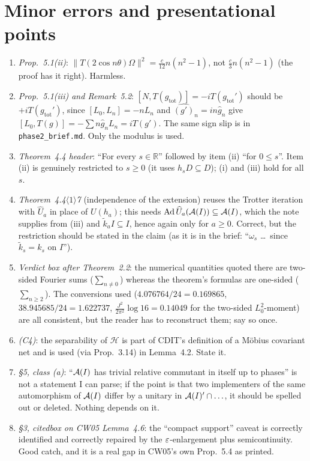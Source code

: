\documentclass[11pt]{article}
\newcommand{\Om}{\Omega}
\newcommand{\Hil}{\mathcal H}
\newcommand{\nrm}[1]{\lVert #1\rVert}
\newcommand{\gtot}{g_{\mathrm{tot}}}
\newcommand{\ktil}{\widetilde k}
\newcommand{\Ad}{\operatorname{Ad}}
\begin{document}
\section{Minor errors and presentational points}\label{sec:minor}

\begin{enumerate}[leftmargin=1.6em,label=\textup{(M\arabic*)}]
\item \emph{Prop.~5.1(ii)}: $\nrm{T(2\cos n\theta)\Om}^2=\frac c{12}n(n^2-1)$, not $\frac c3n(n^2-1)$
(the proof has it right).  Harmless.
\item \emph{Prop.~5.1(iii) and Remark~5.2}: $[N,T(\gtot)]=-iT(\gtot')$ should be $+iT(\gtot')$, since
$[L_0,L_n]=-nL_n$ and $\widehat{(g')}_n=in\hat g_n$ give $[L_0,T(g)]=-\sum n\hat g_nL_n=iT(g')$.  The same sign
slip is in \texttt{phase2\_brief.md}.  Only the modulus is used.
\item \emph{Theorem~4.4 header}: ``For every $s\in\mathbb R$'' followed by item (ii) ``for $0\le s$''.  Item (ii)
is genuinely restricted to $s\ge0$ (it uses $h_sD\subseteq D$); (i) and (iii) hold for all $s$.
\item \emph{Theorem~4.4$\langle1\rangle$7} (independence of the extension) reuses the Trotter iteration with
$\widehat U_a$ in place of $U(h_a)$; this needs $\Ad\widehat U_a(\cA(I))\subseteq\cA(I)$, which the note supplies
from (iii) and $\ktil_aI\subseteq I$, hence again only for $a\ge0$.  Correct, but the restriction should be
stated in the claim (as it is in the brief: ``$\omega_s$ \dots\ since $\ktil_s=k_s$ on $I$'').
\item \emph{Verdict box after Theorem~2.2}: the numerical quantities quoted there are two-sided Fourier sums
($\sum_{n\ne0}$) whereas the theorem's formulas are one-sided ($\sum_{n\ge2}$).  The conversions used
($4.076764/24=0.169865$, $38.945685/24=1.622737$, $\frac{J^2}{2\pi^2}\log16=0.14049$ for the two-sided
$L_0^2$-moment) are all consistent, but the reader has to reconstruct them; say so once.
\item \emph{(C4)}: the separability of $\Hil$ is part of CDIT's definition of a M\"obius covariant net and is
used (via Prop.~3.14) in Lemma~4.2.  State it.
\item \emph{\S5, class (a)}: ``$\mathcal A(I)$ has trivial relative commutant in itself up to phases'' is not a
statement I can parse; if the point is that two implementers of the same automorphism of $\mathcal A(I)$ differ by a
unitary in $\mathcal A(I)'\cap\ldots$, it should be spelled out or deleted.  Nothing depends on it.
\item \emph{\S3, citedbox on CW05 Lemma~4.6}: the ``compact support'' caveat is correctly identified and
correctly repaired by the $\varepsilon$-enlargement plus semicontinuity.  Good catch, and it is a real gap in CW05's
own Prop.~5.4 as printed.
\end{enumerate}
\end{document}
